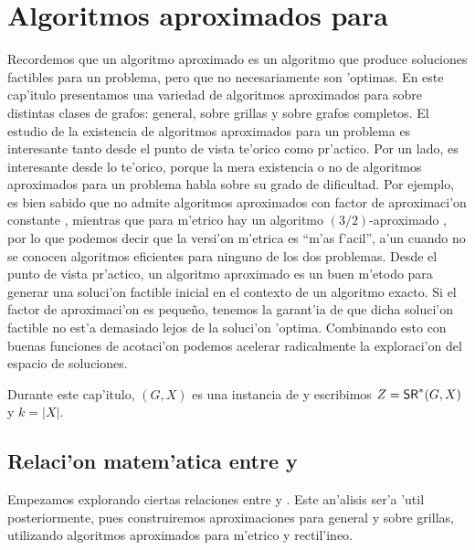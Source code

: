 \chapter{Algoritmos aproximados para }
\label{ch:aproximados}

Recordemos que un algoritmo aproximado es un algoritmo que produce soluciones factibles para un problema, pero que no necesariamente son 'optimas. En este cap'itulo presentamos una variedad de algoritmos aproximados para  sobre distintas clases de grafos: general, sobre grillas y sobre grafos completos. El estudio de la existencia de algoritmos aproximados para un problema es interesante tanto desde el punto de vista te'orico como pr'actico. Por un lado, es interesante desde lo te'orico, porque la mera existencia o no de algoritmos aproximados para un problema habla sobre su grado de dificultad. Por ejemplo, es bien sabido que  no admite algoritmos aproximados con factor de aproximaci'on constante \cite[p. 147]{Ga76}, mientras que para  m'etrico hay un algoritmo $(3/2)$-aproximado \cite[p. 132]{Ga76}, por lo que podemos decir que la versi'on m'etrica es ``m'as f'acil'', a'un cuando no se conocen algoritmos eficientes para ninguno de los dos problemas. Desde el punto de vista pr'actico, un algoritmo aproximado es un buen m'etodo para generar una soluci'on factible inicial en el contexto de un algoritmo exacto. Si el factor de aproximaci'on es peque\~no, tenemos la garant'ia de que dicha soluci'on factible no est'a demasiado lejos de la soluci'on 'optima. Combinando esto con buenas funciones de acotaci'on podemos acelerar radicalmente la exploraci'on del espacio de soluciones.

Durante este cap'itulo, $(G, X)$ es una instancia de  y escribimos $Z = \textnormal{\textsf{SR}}^*(G, X)$ y $k = |X|$.

\section{Relaci'on matem'atica entre  y }

Empezamos explorando ciertas relaciones entre  y . Este an'alisis ser'a 'util posteriormente, pues construiremos aproximaciones para  general y sobre grillas, utilizando algoritmos aproximados para  m'etrico y rectil'ineo.

